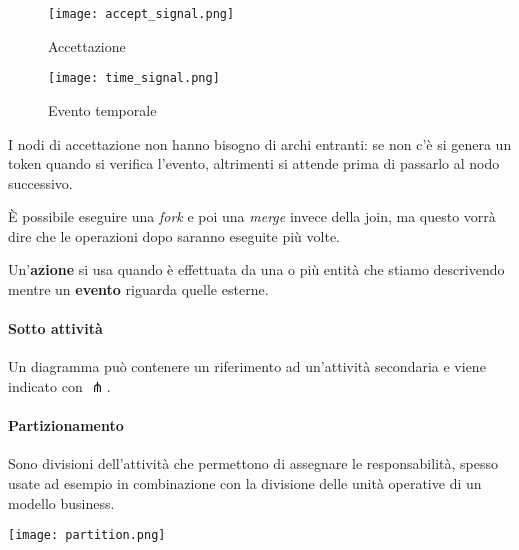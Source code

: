 \begin{itemize}
\begin{figure}[!h]
\begin{minipage}[b]{0.2\textwidth}
			\texttt{[image: accept\_signal.png]}
			\caption*{Accettazione}
		\end{minipage}
		\hspace{0.1\textwidth}
		\begin{minipage}[b]{0.2\textwidth}
			\texttt{[image: time\_signal.png]}
			\caption*{Evento temporale}
		\end{minipage}
	\end{figure}
	I nodi di accettazione non hanno bisogno di archi entranti: se non c'è si genera un token quando si verifica l'evento, altrimenti si attende prima di passarlo al nodo successivo.
\end{itemize}

\begin{note}
	È possibile eseguire una \textit{fork} e poi una \textit{merge} invece della join, ma questo vorrà dire che le operazioni dopo saranno eseguite più volte.
\end{note}

\begin{note}
	Un'\textbf{azione} si usa quando è effettuata da una o più entità che stiamo descrivendo mentre un \textbf{evento} riguarda quelle esterne.
\end{note}

\paragraph{Sotto attività}
Un diagramma può contenere un riferimento ad un'attività secondaria e viene indicato con $\pitchfork$.

\paragraph{Partizionamento} Sono divisioni dell'attività che permettono di assegnare le responsabilità, spesso usate ad esempio in combinazione con la divisione delle unità operative di un modello business.
\begin{center}
	\texttt{[image: partition.png]}
\end{center}

